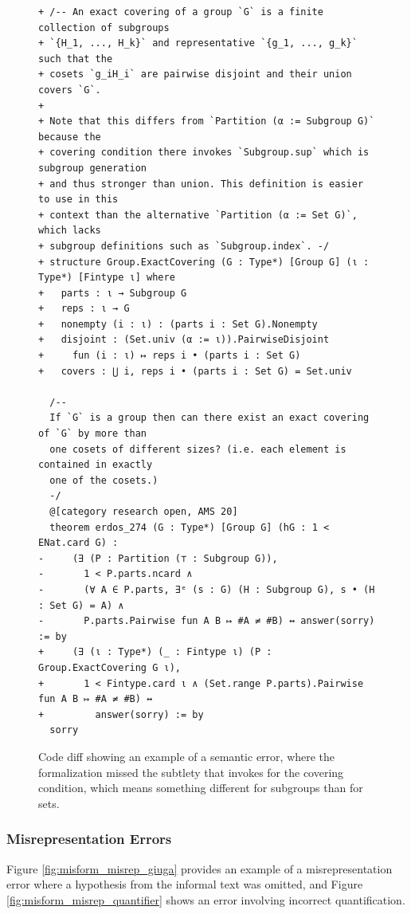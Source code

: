 \begin{figure}
    \centering
    \begin{verbatim}
+ /-- An exact covering of a group `G` is a finite collection of subgroups 
+ `{H_1, ..., H_k}` and representative `{g_1, ..., g_k}` such that the 
+ cosets `g_iH_i` are pairwise disjoint and their union covers `G`.
+ 
+ Note that this differs from `Partition (α := Subgroup G)` because the 
+ covering condition there invokes `Subgroup.sup` which is subgroup generation 
+ and thus stronger than union. This definition is easier to use in this 
+ context than the alternative `Partition (α := Set G)`, which lacks
+ subgroup definitions such as `Subgroup.index`. -/
+ structure Group.ExactCovering (G : Type*) [Group G] (ι : Type*) [Fintype ι] where  
+   parts : ι → Subgroup G
+   reps : ι → G
+   nonempty (i : ι) : (parts i : Set G).Nonempty
+   disjoint : (Set.univ (α := ι)).PairwiseDisjoint 
+     fun (i : ι) ↦ reps i • (parts i : Set G)
+   covers : ⋃ i, reps i • (parts i : Set G) = Set.univ

  /--
  If `G` is a group then can there exist an exact covering of `G` by more than 
  one cosets of different sizes? (i.e. each element is contained in exactly 
  one of the cosets.)
  -/
  @[category research open, AMS 20]
  theorem erdos_274 (G : Type*) [Group G] (hG : 1 < ENat.card G) :
-     (∃ (P : Partition (⊤ : Subgroup G)),
-       1 < P.parts.ncard ∧
-       (∀ A ∈ P.parts, ∃ᵉ (s : G) (H : Subgroup G), s • (H : Set G) = A) ∧
-       P.parts.Pairwise fun A B ↦ #A ≠ #B) ↔ answer(sorry) := by
+     (∃ (ι : Type*) (_ : Fintype ι) (P : Group.ExactCovering G ι),
+       1 < Fintype.card ι ∧ (Set.range P.parts).Pairwise fun A B ↦ #A ≠ #B) ↔ 
+         answer(sorry) := by
  sorry
    \end{verbatim}
    \caption{Code diff showing an example of a semantic error, where the formalization missed the subtlety that  invokes  for the covering condition, which means something different for subgroups than for sets.}
    \label{fig:misform_semantic_covering}
\end{figure}

\clearpage 

\subsubsection{Misrepresentation Errors} 

Figure \ref{fig:misform_misrep_giuga} provides an example of a misrepresentation error where a hypothesis from the informal text was omitted, and Figure \ref{fig:misform_misrep_quantifier} shows an error involving incorrect quantification.

